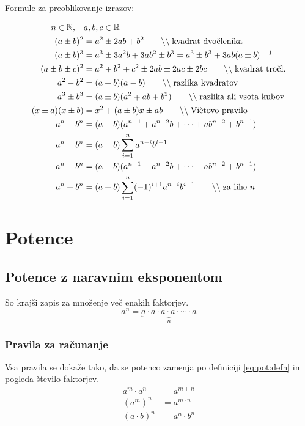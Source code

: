 \documentclass[a4paper,oneside,12pt,fleqn]{article}
\def\R{\ensuremath{\mathbb R}}
\def\N{\ensuremath{\mathbb N}}
\newcommand\krat\cdot
\newcommand{\comment}[1]{\ensuremath{\qquad\backslash\backslash\;}\textnormal{#1}}
\numberwithin{equation}{section}
\begin{document}
Formule za preoblikovanje izrazov:\\
\parbox{\textwidth}{
\begin{align}
   n \in \N, \quad & a, b, c \in \R \nonumber \\
   \label{eq:izr:kvadrat:dvoclenika} (a \pm b)^2 &= a^2 \pm 2ab + b^2 \comment{kvadrat
   dvočlenika} \\
   \label{eq:izr:kub:dvoclenika} (a \pm b)^3 &= a^3 \pm 3a^2b + 3ab^2 \pm b^3 = a^3 \pm
   b^3 + 3ab(a\pm b) \quad \footnotemark \\
   \label{eq:izr:kvadrat:troclenika} (a \pm b \pm c)^2 &= a^2 + b^2 + c^2 \pm 2ab \pm 2ac
   \pm 2bc \comment{kvadrat tročl.} \\
   \label{eq:izr:razlikakvadratov} a^2 - b^2 &= (a+b)(a-b) \comment{razlika kvadratov} \\
   \label{eq:izr:vsotakubov} a^3 \pm b^3 &= (a \pm b)(a^2 \mp ab + b^2) \comment{razlika ali
   vsota kubov} \\
   \label{eq:izr:vietovo} (x\pm a)(x\pm b) &= x^2 + (a\pm b)x \pm ab \comment{Vi\`{e}tovo
   pravilo} \\
   \label{eq:izr:ananminusbnan} a^n - b^n &= (a - b)(a^{n-1} + a^{n-2}b + \cdots
   + ab^{n-2} + b^{n-1}) \\
   a^n - b^n &= (a - b)\sum_{i=1}^{n} a^{n-i}b^{i-1} \nonumber \\
   \label{eq:izr:ananplubnan}  a^n + b^n &=  (a + b)(a^{n-1} - a^{n-2}b + \cdots
   - ab^{n-2} + b^{n-1}) \\
   a^n +b^n &= (a+b)\sum_{i=1}^{n} (-1)^{i+1}a^{n-i}b^{i-1} \comment{za lihe $n$} \nonumber
\end{align}
}

\section{Potence}
\label{sec:pot}
\subsection{Potence z naravnim eksponentom}
\label{sec:pot:nar}
So krajši zapis za množenje več enakih faktorjev.
\begin{equation}
    a^n = \underbrace{a \krat a \krat a \krat a \krat \cdots \krat a}_n
    \label{eq:pot:defn}
\end{equation}

\subsubsection{Pravila za računanje}
\label{sec:pot:nar:prav}
Vsa pravila se dokaže tako, da se potenco zamenja po definiciji \eqref{eq:pot:defn} in
pogleda število faktorjev.
\begin{align}
  a^m \krat a^n &= a^{m+n} \label{eq:pot:anankratanam} \\
  (a^m)^n &= a^{m\krat n} \label{eq:pot:anannam} \\
  (a\krat b)^n &= a^n \krat b^n \label{eq:pot:akratbnan}
\end{align}
\end{document}
